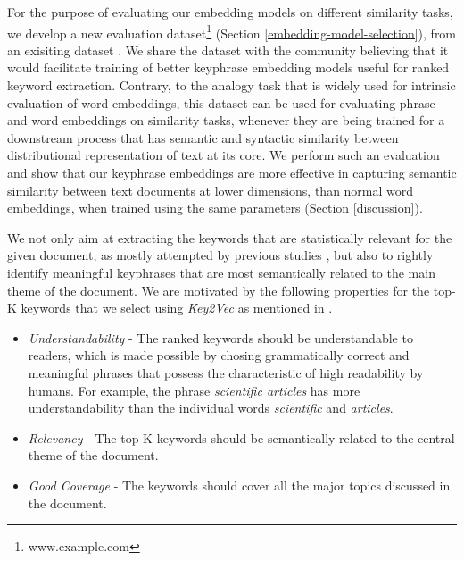 \documentclass[conference]{IEEEtran}
\begin{document}
For the purpose of evaluating our embedding models on different similarity tasks, we develop a new evaluation dataset\footnote{www.example.com} (Section \ref{embedding-model-selection}), from an exisiting dataset \cite{dai2015document}. We share the dataset with the community believing that it would facilitate training of better keyphrase embedding models useful for ranked keyword extraction. Contrary, to the analogy task that is widely used for intrinsic evaluation of word embeddings, this dataset can be used for evaluating phrase and word embeddings on similarity tasks, whenever they are being trained for a downstream process that has semantic and syntactic similarity between distributional representation of text at its core. We perform such an evaluation and show that our keyphrase embeddings are more effective in capturing semantic similarity between text documents at lower dimensions, than normal word embeddings, when trained using the same parameters (Section \ref{discussion}).


We not only aim at extracting the keywords that are statistically relevant for the given document, as mostly attempted by previous studies \cite{hasan2014automatic}, but also to rightly identify meaningful keyphrases that are most semantically related to the main theme of the document. We are motivated by the following properties for the top-K keywords that we select using \textit{Key2Vec} as mentioned in \cite{liu2009clustering}.

\begin{itemize}
\item \textit{Understandability} - The ranked keywords should be understandable to readers, which is made possible by chosing grammatically correct and meaningful phrases that possess the characteristic of high readability by humans. For example, the phrase \textit{scientific articles} has more understandability than the individual words \textit{scientific} and \textit{articles}.  
\item \textit{Relevancy} - The top-K keywords should be semantically related to the central theme of the document.
\item \textit{Good Coverage} - The keywords should cover all the major topics discussed in the document.
\end{itemize}
\end{document}
